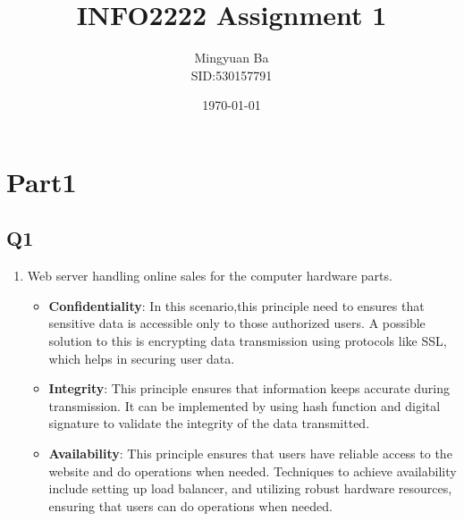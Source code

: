 \documentclass{article}
\begin{document}
\title{INFO2222 Assignment 1}
\author{Mingyuan Ba\\SID:530157791}
\date{\today}
\maketitle


\section{Part1}
\subsection{Q1}
\begin{enumerate}
    \item Web server handling online sales for the computer hardware parts.
        \begin{itemize}
            \item \textbf{Confidentiality}: In this scenario,this principle need to ensures that sensitive data is accessible only to those authorized users\cite{Lecture1}. A possible solution to this is encrypting data transmission using protocols like SSL, which helps in securing user data.
            \item \textbf{Integrity}: This principle ensures that information keeps accurate during transmission\cite{Lecture1}. It can be implemented by using hash function\cite{2-1-1.Hash(1)} and digital signature to validate the integrity of the data transmitted.
            \item \textbf{Availability}: This principle ensures that users have reliable access to the website and do operations when needed\cite{Lecture1}. Techniques to achieve availability include setting up load balancer\cite{AlibabaCloud2019HighAvailability}, and utilizing robust hardware resources, ensuring that users can do operations when needed.
        \end{itemize}
        

\end{enumerate}
\end{document}

